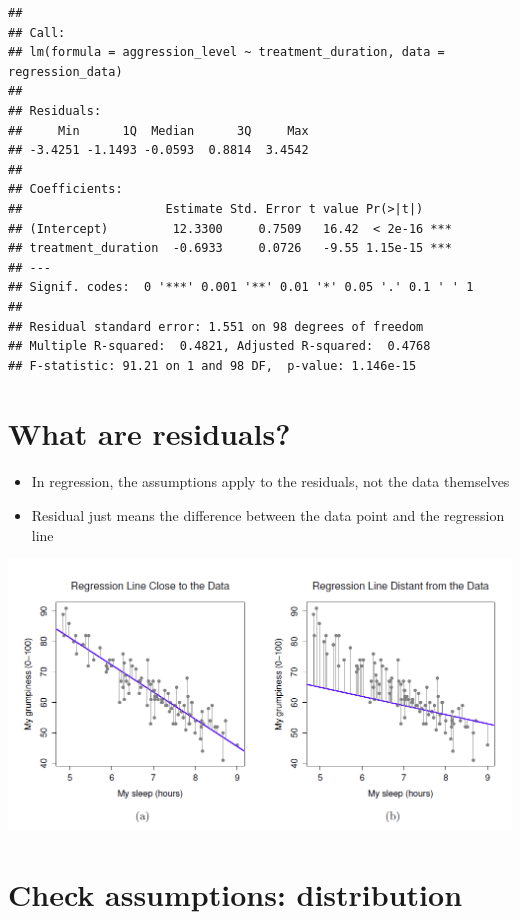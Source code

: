 \documentclass[
]{book}
\providecommand{\tightlist}{%
  \setlength{\itemsep}{0pt}\setlength{\parskip}{0pt}}
\begin{document}
\begin{verbatim}
## 
## Call:
## lm(formula = aggression_level ~ treatment_duration, data = regression_data)
## 
## Residuals:
##     Min      1Q  Median      3Q     Max 
## -3.4251 -1.1493 -0.0593  0.8814  3.4542 
## 
## Coefficients:
##                    Estimate Std. Error t value Pr(>|t|)    
## (Intercept)         12.3300     0.7509   16.42  < 2e-16 ***
## treatment_duration  -0.6933     0.0726   -9.55 1.15e-15 ***
## ---
## Signif. codes:  0 '***' 0.001 '**' 0.01 '*' 0.05 '.' 0.1 ' ' 1
## 
## Residual standard error: 1.551 on 98 degrees of freedom
## Multiple R-squared:  0.4821, Adjusted R-squared:  0.4768 
## F-statistic: 91.21 on 1 and 98 DF,  p-value: 1.146e-15
\end{verbatim}

\hypertarget{what-are-residuals}{%
\section{What are residuals?}\label{what-are-residuals}}

\begin{itemize}
\tightlist
\item
  In regression, the assumptions apply to the residuals, not the data themselves
\item
  Residual just means the difference between the data point and the regression line
\end{itemize}

\begin{center}\includegraphics[width=14.17in]{img/residuals1} \end{center}

\hypertarget{check-assumptions-distribution-1}{%
\section{Check assumptions: distribution}\label{check-assumptions-distribution-1}}
\end{document}

